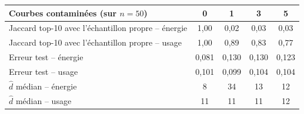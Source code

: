 \begin{tabular}{@{}lcccc@{}}
\toprule
Courbes contaminées (sur $n=50$) & 0 & 1 & 3 & 5 \\
\midrule
Jaccard top-10 avec l'échantillon propre -- énergie & 1{,}00 & 0{,}02 & 0{,}03 & 0{,}03 \\
Jaccard top-10 avec l'échantillon propre -- usage & 1{,}00 & 0{,}89 & 0{,}83 & 0{,}77 \\
\addlinespace
Erreur test -- énergie & 0{,}081 & 0{,}130 & 0{,}130 & 0{,}123 \\
Erreur test -- usage & 0{,}101 & 0{,}099 & 0{,}104 & 0{,}104 \\
\addlinespace
$\hat d$ médian -- énergie & 8 & 34 & 13 & 12 \\
$\hat d$ médian -- usage & 11 & 11 & 11 & 12 \\
\bottomrule
\end{tabular}

